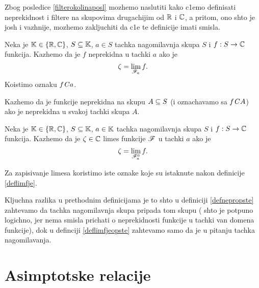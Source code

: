 \documentclass[../main_og.tex]{subfiles}
\begin{document}
    Zbog posledice \ref{filterokolinaposl} mozhemo naslutiti kako c1emo definisati neprekidnost i filtere na skupovima drugachijim od $\mathbb{R}$ i $\mathbb{C}$,
    a pritom, ono shto je josh i vazhnije, mozhemo zakljuchiti da c1e te definicije imati smisla. 

    \begin{de}
    	\label{defnepropste}
    	Neka je $\mathbb{K}\in \{\mathbb{R}, \mathbb{C}\}$, $S\subseteq \mathbb{K}$, $a\in S$ tachka nagomilavnja skupa $S$ i $f:S \to \mathbb{C}$ funkcija. Kazhemo da je $f$ neprekidna u tachki $a$
	ako je \[\zeta=\lim_{\mathscr{F}_a}f.\] Koistimo oznaku $f\mathit{C} a$.
    \end{de}
    Kazhemo da je funkcije neprekidna na skupu $A \subseteq S$ (i oznachavamo sa $f \mathit{C} A$) ako je neprekidna u svakoj tachki skupa $A$.
    \begin{de}
    	\label{deflimfjeopste}
    	Neka je $\mathbb{K}\in \{\mathbb{R}, \mathbb{C}\}$, $S\subseteq \mathbb{K}$, $a\in \mathbb{K}$ tachka nagomilavnja skupa $S$ i $f:S \to \mathbb{C}$ funkcija.
	Kazhemo da je $\zeta \in \mathbb{C}$ limes funkcije $\mathscr{F}$ u tachki $a$
	ako je \[\zeta=\lim_{\mathscr{F}_a^0}f.\] 
    \end{de}
    Za zapisivanje limesa koristimo iste oznake koje su istaknute nakon definicije \ref{deflimfje}.

    \begin{nap}
    	Kljuchna razlika u prethodnim definicijama je to shto u definiciji \ref{defnepropste} zahtevamo da tachka nagomilavnja skupa pripada tom skupu (
	shto je potpuno logichno, jer nema smisla prichati o neprekidnosti funkcije u tachki van domena funkcije), dok u definciji \ref{deflimfjeopste} 
	zahtevamo samo da je u pitanju tachka nagomilavanja.
    \end{nap}
\section{Asimptot\-ske relacije}
    
    
\end{document}

